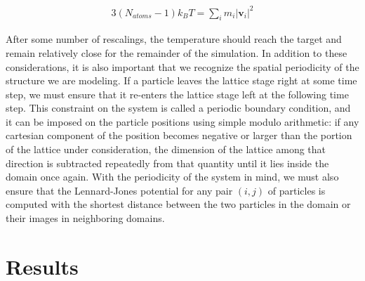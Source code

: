 \documentclass[10pt,a4paper]{article}
\begin{document}
\begin{align}
3(N_{atoms}-1)k_B T = \sum_i m_i |\mathbf{v}_i|^2
\label{eq:kine}
\end{align}

After some number of rescalings, the temperature should reach the target and remain relatively close for the remainder of the simulation. In addition to these considerations, it is also important that we recognize the spatial periodicity of the structure we are modeling. If a particle leaves the lattice stage right at some time step, we must ensure that it re-enters the lattice stage left at the following time step. This constraint on the system is called a periodic boundary condition, and it can be imposed on the particle positions using simple modulo arithmetic: if any cartesian component of the position becomes negative or larger than the portion of the lattice under consideration, the dimension of the lattice among that direction is subtracted repeatedly from that quantity until it lies inside the domain once again. With the periodicity of the system in mind, we must also ensure that the Lennard-Jones potential for any pair $(i,j)$ of particles is computed with the shortest distance between the two particles in the domain or their images in neighboring domains.

\section{Results}
\end{document}
